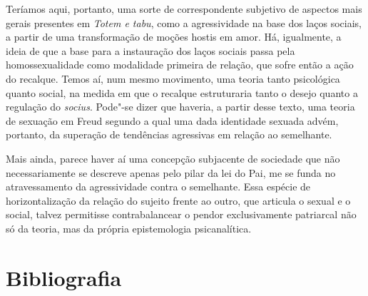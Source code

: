 Teríamos aqui, portanto, uma sorte de correspondente subjetivo de
aspectos mais gerais presentes em \emph{Totem e tabu}, como a agressividade
na base dos laços sociais, a partir de uma transformação de moções
hostis em amor. Há, igualmente, a ideia de que a base para a instauração
dos laços sociais passa pela homossexualidade como modalidade primeira
de relação, que sofre então a ação do recalque. Temos aí, num mesmo
movimento, uma teoria tanto psicológica quanto social, na medida em que
o recalque estruturaria tanto o desejo quanto a regulação do
\emph{socius}. Pode"-se dizer que haveria, a partir desse texto, uma
teoria de sexuação em Freud segundo a qual uma dada identidade sexuada
advém, portanto, da superação de tendências agressivas em relação ao
semelhante.

Mais ainda, parece haver aí uma concepção subjacente de sociedade que
não necessariamente se descreve apenas pelo pilar da lei do Pai, me se
funda no atravessamento da agressividade contra o semelhante. Essa
espécie de horizontalização da relação do sujeito frente ao outro, que
articula o sexual e o social, talvez permitisse contrabalancear o pendor
exclusivamente patriarcal não só da teoria, mas da própria epistemologia
psicanalítica.

\section{Bibliografia}

